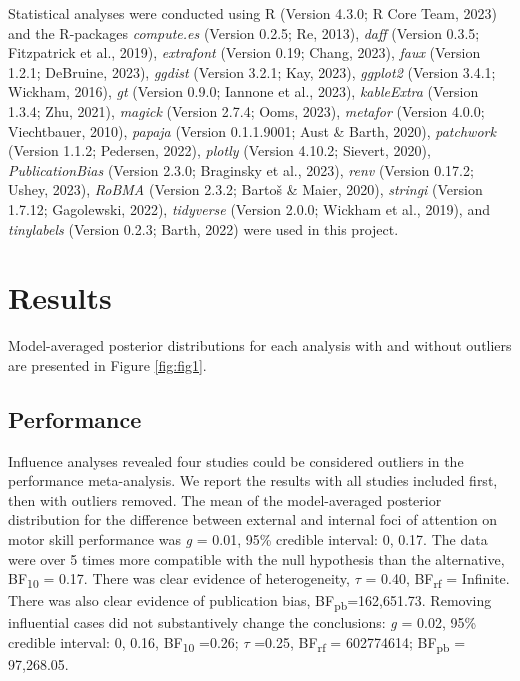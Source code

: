 \documentclass[
  11pt,
  doc, donotrepeattitle,floatsintext]{apa7}
\begin{document}
Statistical analyses were conducted using R (Version 4.3.0; R Core Team, 2023) and the R-packages \emph{compute.es} (Version 0.2.5; Re, 2013), \emph{daff} (Version 0.3.5; Fitzpatrick et al., 2019), \emph{extrafont} (Version 0.19; Chang, 2023), \emph{faux} (Version 1.2.1; DeBruine, 2023), \emph{ggdist} (Version 3.2.1; Kay, 2023), \emph{ggplot2} (Version 3.4.1; Wickham, 2016), \emph{gt} (Version 0.9.0; Iannone et al., 2023), \emph{kableExtra} (Version 1.3.4; Zhu, 2021), \emph{magick} (Version 2.7.4; Ooms, 2023), \emph{metafor} (Version 4.0.0; Viechtbauer, 2010), \emph{papaja} (Version 0.1.1.9001; Aust \& Barth, 2020), \emph{patchwork} (Version 1.1.2; Pedersen, 2022), \emph{plotly} (Version 4.10.2; Sievert, 2020), \emph{PublicationBias} (Version 2.3.0; Braginsky et al., 2023), \emph{renv} (Version 0.17.2; Ushey, 2023), \emph{RoBMA} (Version 2.3.2; Bartoš \& Maier, 2020), \emph{stringi} (Version 1.7.12; Gagolewski, 2022), \emph{tidyverse} (Version 2.0.0; Wickham et al., 2019), and \emph{tinylabels} (Version 0.2.3; Barth, 2022) were used in this project.

\hypertarget{results}{%
\section{Results}\label{results}}

Model-averaged posterior distributions for each analysis with and without outliers are presented in Figure \ref{fig:fig1}.

\hypertarget{performance}{%
\subsection{Performance}\label{performance}}

Influence analyses revealed four studies could be considered outliers in the performance meta-analysis. We report the results with all studies included first, then with outliers removed. The mean of the model-averaged posterior distribution for the difference between external and internal foci of attention on motor skill performance was \emph{g} = 0.01, 95\% credible interval: 0, 0.17. The data were over 5 times more compatible with the null hypothesis than the alternative, BF\textsubscript{10} = 0.17. There was clear evidence of heterogeneity, \(\tau\) = 0.40, BF\textsubscript{rf} = Infinite. There was also clear evidence of publication bias, BF\textsubscript{pb}=162,651.73. Removing influential cases did not substantively change the conclusions: \emph{g} = 0.02, 95\% credible interval: 0, 0.16, BF\textsubscript{10} =0.26; \(\tau\) =0.25, BF\textsubscript{rf} = 602774614; BF\textsubscript{pb} = 97,268.05.
\end{document}
